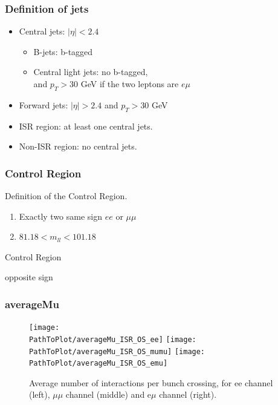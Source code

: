 \documentclass[mathserif,serif]{beamer}
\begin{document}
\begin{frame}
\frametitle{Definition of jets}
\normalsize
\begin{itemize}
\item Central jets: $|\eta|<2.4$
\begin{itemize}
\item B-jets: b-tagged
\item Central light jets: no b-tagged,\\
and $p_T>30$ GeV if the two leptons are $e\mu$
\end{itemize}
\item Forward jets: $|\eta|>2.4$ and $p_T>30$ GeV
\item ISR region: at least one central jets.
\item Non-ISR region: no central jets.
\end{itemize}
\end{frame}

\begin{frame}
\frametitle{Control Region}
Definition of the Control Region.
\begin{enumerate}
\item Exactly two same sign $ee$ or $\mu\mu$
\item $81.18 < m_{ll} < 101.18$
\end{enumerate}
\end{frame}

\begin{frame}
\begin{center}
\huge
Control Region
\end{center}
\end{frame}

%

\def \PathToPlot {../plot}
%

\begin{frame}
\begin{center}
\huge
opposite sign
\end{center}
\end{frame}

%
%

\def \PathToPlot {../plot}
\begin{frame}
\frametitle{averageMu}
\begin{figure}
\texttt{[image: \\PathToPlot/averageMu\_ISR\_OS\_ee]}
\texttt{[image: \\PathToPlot/averageMu\_ISR\_OS\_mumu]}
\texttt{[image: \\PathToPlot/averageMu\_ISR\_OS\_emu]} \\
\caption{Average number of interactions per bunch crossing, for ee channel (left), $\mu\mu$ channel (middle) and e$\mu$ channel (right).}
\end{figure}
\end{frame}
\end{document}

